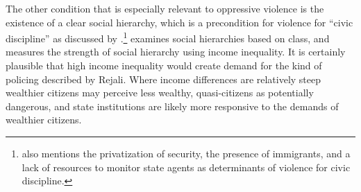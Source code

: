 \documentclass[11pt]{article}
\begin{document}
The other condition that is especially relevant to oppressive violence is the existence of a clear social hierarchy, which is a precondition for violence for ``civic discipline'' as discussed by \citep{Rejali2007}.\footnote{\citet{Rejali2007} also mentions the privatization of security, the presence of immigrants, and a lack of resources to monitor state agents as determinants of violence for civic discipline.} \citet{Haschke2018} examines social hierarchies based on class, and measures the strength of social hierarchy using income inequality. It is certainly plausible that high income inequality would create demand for the kind of policing described by Rejali. Where income differences are relatively steep wealthier citizens may perceive less wealthy, quasi-citizens as potentially dangerous, and state institutions are likely more responsive to the demands of wealthier citizens. 
\end{document}
